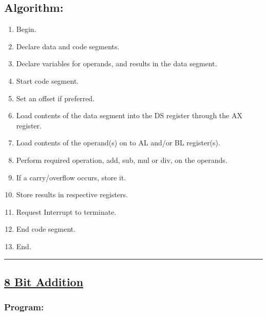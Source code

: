 \documentclass[12pt,a4paper]{article}
\begin{document}
\begin{flushleft}
\subsection*{\textbf{Algorithm:}}
\begin{enumerate}
    \item Begin.
    \item Declare data and code segments.
    \item Declare variables for operands, and results in the data segment.
    \item Start code segment.
    \item Set an offset if preferred.
    \item Load contents of the data segment into the DS register through the AX register.
    \item Load contents of the operand(s) on to AL and/or BL register(s).
    \item Perform required operation, add, sub, mul or div, on the operands.
    \item If a carry/overflow occurs, store it.
    \item Store results in respective registers.
    \item Request Interrupt to terminate.
    \item End code segment.
    \item End. 
\end{enumerate}
\hrule
\newpage
\subsection*{\textbf{\underline{8 Bit Addition}}}

\subsubsection*{\textbf{Program:}}


\end{flushleft}
\end{document}
